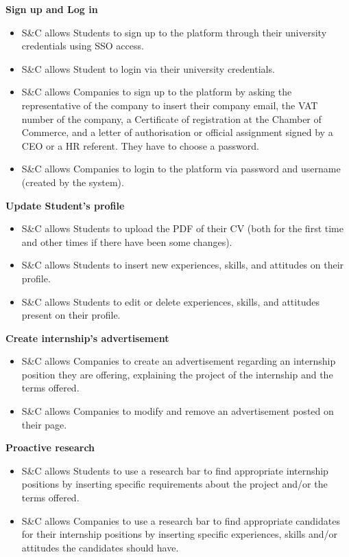 \textbf{Sign up and Log in}
\begin{itemize}
    \item[\text{[R1]}] S\&C allows Students to sign up to the platform through their university credentials using SSO access.
    \item[\text{[R2]}] S\&C allows Student to login via their university credentials.
    \item[\text{[R3]}] S\&C allows Companies to sign up to the platform by asking the representative of the company to insert their company email, the VAT number of the company, a Certificate of registration at the Chamber of Commerce, and a letter of authorisation or official assignment signed by a CEO or a HR referent. They have to choose a password.
    \item[\text{[R4]}] S\&C allows Companies to login to the platform via password and username (created by the system).
    
\end{itemize}

\textbf{Update Student's profile}
\begin{itemize}
    \item[\text{[R5]}] S\&C allows Students to upload the PDF of their CV (both for the first time and other times if there have been some changes).
    \item[\text{[R6]}] S\&C allows Students to insert new experiences, skills, and attitudes on their profile.
    \item[\text{[R7]}] S\&C allows Students to edit or delete experiences, skills, and attitudes present on their profile.
\end{itemize}

\textbf{Create internship's advertisement}
\begin{itemize}
    \item[\text{[R8]}] S\&C allows Companies to create an advertisement regarding an internship position they are offering, explaining the project of the internship and the terms offered.

    \item[\text{[R9]}] S\&C allows Companies to modify and remove an advertisement posted on their page.
\end{itemize}

\textbf{Proactive research}
\begin{itemize}
    \item[\text{[R10]}] S\&C allows Students to use a research bar to find appropriate internship positions by inserting specific requirements about the project and/or the terms offered.
    
    \item[\text{[R11]}] S\&C allows Companies to use a research bar to find appropriate candidates for their internship positions by inserting specific experiences, skills and/or attitudes the candidates should have.
\end{itemize}

